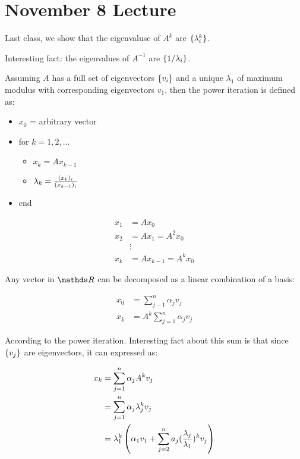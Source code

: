 \section{November 8 Lecture}

Last class, we show that the eigenvaluse of $A^k$ are $\{\lambda_i^k\}$.

Interesting fact: the eigenvalues of $A^{-1}$ are $\{1/\lambda_i\}$.

Assuming $A$ has a full set of eigenvectors $\{v_i\}$ and a unique $\lambda_1$ of maximum modulus with corresponding eigenvectors $v_1$, then the power iteration is defined as:

\begin{itemize}
  \item $x_0$ = arbitrary vector
  \item for $k=1,2,\dots$
  \begin{itemize}
    \item $x_k = Ax_{k-1}$
    \item $\lambda_k = {(x_k)_i \over (x_{k-1})_i}$
  \end{itemize}
  \item end
\end{itemize}

\begin{align*}
  x_1 &= Ax_0 \\
  x_2 &=Ax_1 = A^2 x_0 \\
  &\vdots \\
  x_k &= Ax_{k-1} = A^k x_0
\end{align*}

Any vector in $\bbR$ can be decomposed as a linear combination of a basis:

\begin{align*}
  x_0 &= \sum_{j-1}^n \alpha_j v_j \\
  x_k &= A^k \sum_{j=1}^n \alpha_j v_j
\end{align*}

According to the power iteration. Interesting fact about this sum is that since $\{v_j\}$ are eigenvectors, it can expressed as:

\begin{align*}
  x_k &= \sum_{j=1}^n \alpha_j A^k v_j \\
      &= \sum_{j=1}^n \alpha_j \lambda_j^k v_j \\
      &= \lambda_1^k \left(\alpha_1 v_1 + \sum_{j=2}^n a_j ({\lambda_j \over \lambda_1})^k v_j \right)\\
\end{align*}

